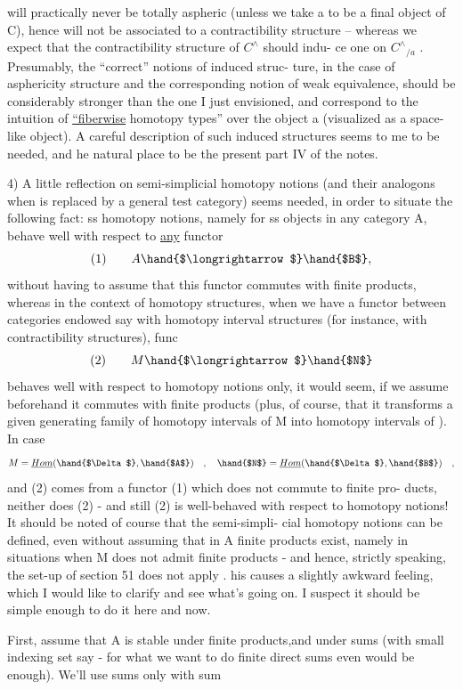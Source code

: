 will practically never be totally aspheric (unless we take a to be a final
object of C), hence will not be associated to a contractibility structure
-- whereas we expect that the contractibility structure of $C^\wedge$ should indu-%
ce one on $C^\wedge{}_{/a}$ . Presumably, the ``correct'' notions of induced struc-%
ture, in the case of asphericity structure and the corresponding notion
of weak equivalence, should be  considerably stronger than the
one I just envisioned, and correspond to the intuition of \uline{``fiberwise}
homotopy types'' over the object a (visualized as a space-like object).
A careful description of such induced structures seems to me to be
needed, and he natural place to be the present part IV of the notes.

4) A little reflection on semi-simplicial homotopy notions (and their
analogons when \hand{$\Delta$} is replaced by a general test category\inserted{$\Delta$}) seems needed,
in order to situate the following fact: ss homotopy notions, namely for
ss objects in any category A, behave well with respect to \uline{any} functor
\[ (1) \qquad A \hand{$\longrightarrow$} \hand{$B$} , \]
without having to assume that this functor commutes with finite products,
whereas  in the context of homotopy structures, when we
have a functor between categories endowed say with homotopy interval
structures (for instance, with contractibility structures),  func
\[ (2) \qquad M \hand{$\longrightarrow$} \hand{$N$} \]
behaves well with respect to homotopy notions only, it would seem, if
we assume beforehand it commutes with finite products (plus, of course,
that it transforms a given generating family of homotopy intervals  of
M into homotopy intervals of ). In case
\[ M = \underline{Hom}(\hand{$\Delta$},\hand{$A$}) \quad , \quad \hand{$N$} = \underline{Hom}(\hand{$\Delta$},\hand{$B$}) \quad , \]
and  (2) comes from a functor (1) which does not commute to finite pro-%
ducts,  neither does (2) - and still (2) is well-behaved with respect
to  homotopy notions! It should be noted of course that the semi-simpli-%
cial homotopy notions  can be defined, even without assuming that in A
finite products exist, namely in situations when M does not admit finite
products - and hence, strictly speaking, the set-up of section 51 does
not apply .  his causes a slightly awkward feeling, which I would like
to clarify and see what's going on. I suspect it should be simple enough
to do it here and now.

First, assume that A is stable under finite products,and under
 sums (with small indexing set say - for what we want to do
finite direct sums even would be enough). We'll use sums only with sum\hand{-}

